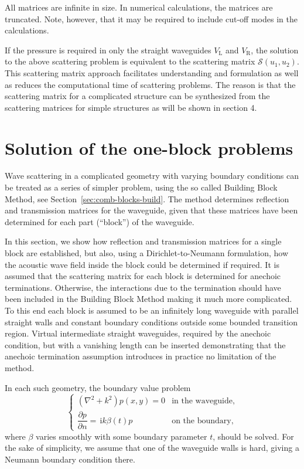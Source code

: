 \documentclass[numreferences]{kluwer}
\renewcommand{\i}{\,\mathrm{i}}
\newcommand{\pd}[2]{\dfrac{\partial#1}{\partial#2}}
\begin{document}
All matrices are infinite in size. In numerical calculations, the
matrices are truncated. Note, however, that it may be required to
include cut-off modes in the calculations.

If the pressure is required in only the straight waveguides
$V_{\text{L}}$ and $V_{\text{R}}$, the solution to the above
scattering problem is equivalent to the scattering matrix
$\mathcal{S}(u_1,u_2)$. This scattering matrix approach facilitates
understanding and formulation as well as reduces the computational
time of scattering problems. The reason is that the scattering matrix
for a complicated structure can be synthesized from the scattering
matrices for simple structures as will be shown in section 4.

\section{Solution of the one-block problems}
\label{sec:oneblock}

Wave scattering in a complicated geometry with varying boundary
conditions can be treated as a series of simpler problem, using the so
called Building Block Method, see
Section~\ref{sec:comb-blocks-build}. The method determines reflection
and transmission matrices for the waveguide, given that these matrices
have been determined for each part (``block'') of the waveguide.

In this section, we show how reflection and transmission matrices for
a single block are established, but also, using a Dirichlet-to-Neumann
formulation, how the acoustic wave field inside the block could be
determined if required. It is assumed that the scattering matrix for
each block is determined for anechoic terminations. Otherwise, the
interactions due to the termination should have been included in the
Building Block Method making it much more complicated. To this end
each block is assumed to be an infinitely long waveguide with parallel
straight walls and constant boundary conditions outside some bounded
transition region. Virtual intermediate straight waveguides, required
by the anechoic condition, but with a vanishing length can be inserted
\cite{nilssonbrander1981b} demonstrating that the anechoic termination
assumption introduces in practice no limitation of the method.

In each such geometry, the boundary value problem
\begin{equation}
  \label{eq:bvp1}
  \begin{cases}
    \left(\nabla^2+k^2\right)p(x,y)=0&\text{in the waveguide,}\\[1ex]
    \pd pn=\i k\beta(t)p&\text{on the boundary,}
  \end{cases}
\end{equation}
where $\beta$ varies smoothly with some boundary parameter $t$, should
be solved. For the sake of simplicity, we assume that one of the
waveguide walls is hard, giving a Neumann boundary condition there.
\end{document}
